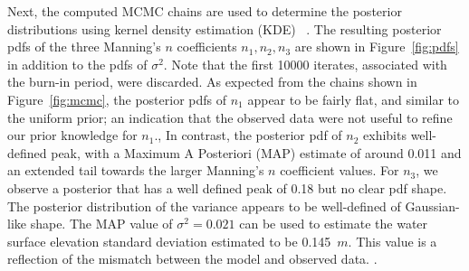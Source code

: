 Next, the computed MCMC chains are used to determine the posterior 
distributions using kernel density estimation (KDE)
~\citep{Parzen1962,Silverman1986}.  The resulting posterior pdfs 
of the three Manning's $n$ coefficients $n_1,n_2,n_3$ are shown 
in Figure~\ref{fig:pdfs} in addition to the pdfs of $\sigma^2$. 
Note that the first 10000 iterates, associated with the burn-in period, were discarded.  
As expected from the chains shown in Figure~\ref{fig:mcmc}, the posterior pdfs of $n_1$ appear to be fairly flat, 
and similar to the uniform prior; an indication that 
the observed data were not useful to refine our prior knowledge for $n_1$.,
In contrast, the posterior pdf of $n_2$ exhibits well-defined peak, 
with a Maximum A Posteriori (MAP) estimate of around 0.011
and an extended tail towards the larger Manning's $n$ coefficient values.
For $n_3$, we observe a posterior that has a well defined peak
of 0.18 but no clear pdf shape. The posterior distribution of the variance 
appears to be well-defined of Gaussian-like shape. 
The MAP value of $\sigma^2=0.021$ can be used to estimate the water surface elevation standard 
deviation estimated to be 0.145~$m$. 
This value is a reflection of the mismatch between the model and 
observed data. .





